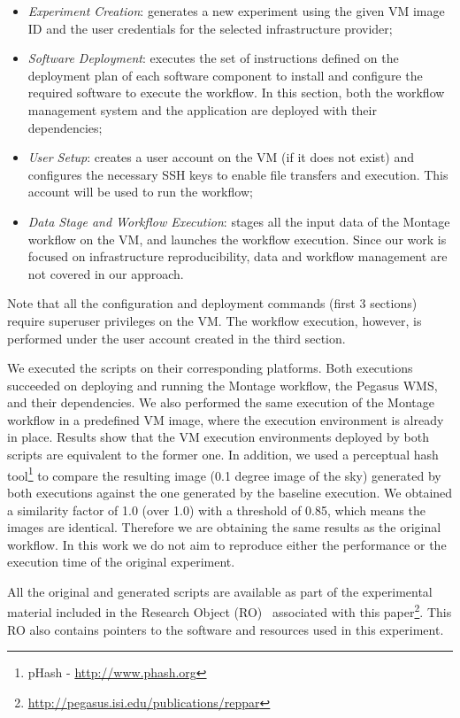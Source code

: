 \begin{itemize}

	\item \emph{Experiment Creation}: generates a new experiment using the given VM image ID and the user credentials for the selected infrastructure provider;
    	    
	\item \emph{Software Deployment}: executes the set of instructions defined on the deployment plan of each software component to install and configure the required software to execute the workflow. In this section, both the workflow management system and the application are deployed with their dependencies;

	\item \emph{User Setup}: creates a user account on the VM (if it does not exist) and configures the necessary SSH keys to enable file transfers and execution. This account will be used to run the workflow;
	   
	\item \emph{Data Stage and Workflow Execution}: stages all the input data of the Montage workflow on the VM, and launches the workflow execution. Since our work is focused on infrastructure reproducibility, data and workflow management are not covered in our approach.

\end{itemize}

\noindent Note that all the configuration and deployment commands (first 3 sections) require superuser privileges on the VM. The workflow execution, however, is performed under the user account created in the third section.

We executed the scripts on their corresponding platforms. Both executions succeeded on deploying and running the Montage workflow, the Pegasus WMS, and their dependencies. We also performed the same execution of the Montage workflow in a predefined VM image, where the execution environment is already in place. Results show that the VM execution environments deployed by both scripts are equivalent to the former one. In addition, we used a perceptual hash tool\footnote{pHash - \url{http://www.phash.org}} to compare the resulting image (0.1 degree image of the sky) generated by both executions against the one generated by the baseline execution. We obtained a similarity factor of 1.0 (over 1.0) with a threshold of 0.85, which means the images are identical. Therefore we are obtaining the same results as the original workflow. In this work we do not aim to reproduce either the performance or the execution time of the original experiment.


All the original and generated scripts are available as part of the experimental material included in the Research Object (RO)~\cite{researchObjects} associated with this paper\footnote{\url{http://pegasus.isi.edu/publications/reppar}}. This RO also contains pointers to the software and resources used in this experiment.